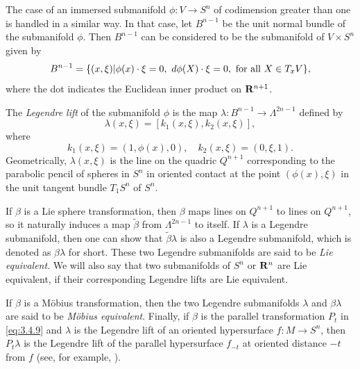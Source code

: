 \documentclass[12pt]{article}
\begin{document}
The case of an immersed submanifold $\phi :V \rightarrow S^n$ of codimension 
greater than one is handled in a similar way.
In that case, let
$B^{n-1}$ be the unit normal bundle
 of the submanifold $\phi$.  Then $B^{n-1}$ can be considered to be the
submanifold of $V \times S^n$ given by
\begin{displaymath}
B^{n-1} = \{ (x,\xi)| \phi(x) \cdot \xi = 0, \ d\phi(X) \cdot \xi = 0,\  \mbox{\rm for all }X \in T_xV\},
\end{displaymath} 
where the dot indicates the Euclidean inner product on ${\bf R}^{n+1}$.



The {\em Legendre lift} of the submanifold $\phi$
is the map $\lambda: B^{n-1} \rightarrow \Lambda^{2n-1}$ defined by
\begin{equation}
\label{eq:3.3.2}
\lambda(x,\xi) = [k_1(x,\xi), k_2 (x,\xi)],
\end{equation} 
where
\begin{equation}
\label{eq:3.3.3}
k_1(x,\xi) = (1, \phi(x), 0), \quad k_2(x,\xi) = (0, \xi, 1).
\end{equation} 
Geometrically, $\lambda(x,\xi)$ is the line on the quadric $Q^{n+1}$ corresponding to the 
parabolic pencil
of spheres in $S^n$ in oriented contact at the point $(\phi(x),\xi)$ in the unit tangent bundle $T_1S^n$ of $S^n$.  


If $\beta$  is a Lie sphere transformation, then $\beta$ maps lines on
$Q^{n+1}$ to lines on $Q^{n+1}$, so it naturally
induces a map $\widetilde{\beta }$ from 
$\Lambda ^{2n-1}$ to itself.  If $\lambda$ is a
Legendre submanifold, then one can show that $\widetilde{\beta}\lambda$
is also a Legendre submanifold, which is denoted as
$\beta \lambda$ for short.  These two Legendre
submanifolds are said to be {\em Lie equivalent}.
We will also say that two submanifolds of $S^n$ or ${\bf R}^n$
are Lie equivalent, if their corresponding Legendre lifts
are Lie equivalent. 
 
If $\beta$ is a M\"{o}bius transformation, then the two Legendre
submanifolds  $\lambda$ and $\beta \lambda$ are said to be {\em M\"{o}bius equivalent}.
Finally, if $\beta$ is the parallel transformation $P_t$ in \eqref{eq:3.4.9} and
$\lambda$ is the Legendre lift of an
oriented hypersurface $f:M \rightarrow S^n$, then
$P_t\lambda$ is the Legendre lift of the
parallel hypersurface $f_{-t}$ at oriented distance $-t$ from $f$ (see, for example, \cite[p.67]{Cec1}).
\end{document}
